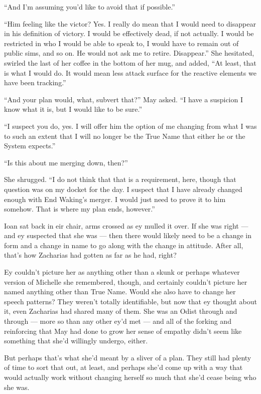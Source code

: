 ``And I'm assuming you'd like to avoid that if possible.''

``Him feeling like the victor? Yes. I really do mean that I would need to disappear in his definition of victory. I would be effectively dead, if not actually. I would be restricted in who I would be able to speak to, I would have to remain out of public sims, and so on. He would not ask me to retire. Disappear.'' She hesitated, swirled the last of her coffee in the bottom of her mug, and added, ``At least, that is what I would do. It would mean less attack surface for the reactive elements we have been tracking.''

``And your plan would, what, subvert that?'' May asked. ``I have a suspicion I know what it is, but I would like to be sure.''

``I suspect you do, yes. I will offer him the option of me changing from what I was to such an extent that I will no longer be the True Name that either he or the System expects.''

``Is this about me merging down, then?''

She shrugged. ``I do not think that that is a requirement, here, though that question was on my docket for the day. I suspect that I have already changed enough with End Waking's merger. I would just need to prove it to him somehow. That is where my plan ends, however.''

Ioan sat back in eir chair, arms crossed as ey mulled it over. If she was right — and ey suspected that she was — then there would likely need to be a change in form and a change in name to go along with the change in attitude. After all, that's how Zacharias had gotten as far as he had, right?

Ey couldn't picture her as anything other than a skunk or perhaps whatever version of Michelle she remembered, though, and certainly couldn't picture her named anything other than True Name. Would she also have to change her speech patterns? They weren't totally identifiable, but now that ey thought about it, even Zacharias had shared many of them. She was an Odist through and through — more so than any other ey'd met — and all of the forking and reinforcing that May had done to grow her sense of empathy didn't seem like something that she'd willingly undergo, either.

But perhaps that's what she'd meant by a sliver of a plan. They still had plenty of time to sort that out, at least, and perhaps she'd come up with a way that would actually work without changing herself so much that she'd cease being who she was.

